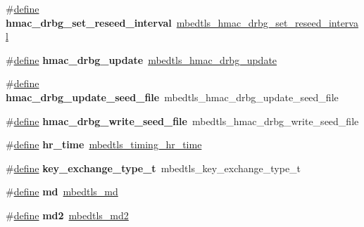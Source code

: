 \begin{DoxyCompactItemize}
\#\hyperlink{structdefine}{define} {\bfseries hmac\+\_\+drbg\+\_\+set\+\_\+reseed\+\_\+interval}~\hyperlink{hmac__drbg_8h_a17f9f894c4765e75d66b5b2fc8404fb2}{mbedtls\+\_\+hmac\+\_\+drbg\+\_\+set\+\_\+reseed\+\_\+interval}
\item 
\mbox{\label{compat-1_83_8h_af20facd5dc049dcf8adbb621e419fe89}} 
\#\hyperlink{structdefine}{define} {\bfseries hmac\+\_\+drbg\+\_\+update}~\hyperlink{hmac__drbg_8h_a19bdd8733bf4ffdec688367c77f7befa}{mbedtls\+\_\+hmac\+\_\+drbg\+\_\+update}
\item 
\mbox{\label{compat-1_83_8h_a1ffc2bde5a15ce6b17c2ed4d7160d472}} 
\#\hyperlink{structdefine}{define} {\bfseries hmac\+\_\+drbg\+\_\+update\+\_\+seed\+\_\+file}~mbedtls\+\_\+hmac\+\_\+drbg\+\_\+update\+\_\+seed\+\_\+file
\item 
\mbox{\label{compat-1_83_8h_ac44be22985d78e772a6c8681a748fddf}} 
\#\hyperlink{structdefine}{define} {\bfseries hmac\+\_\+drbg\+\_\+write\+\_\+seed\+\_\+file}~mbedtls\+\_\+hmac\+\_\+drbg\+\_\+write\+\_\+seed\+\_\+file
\item 
\mbox{\label{compat-1_83_8h_a7d6d2dba30ab5608bed7a872e3aee565}} 
\#\hyperlink{structdefine}{define} {\bfseries hr\+\_\+time}~\hyperlink{structmbedtls__timing__hr__time}{mbedtls\+\_\+timing\+\_\+hr\+\_\+time}
\item 
\mbox{\label{compat-1_83_8h_ada8ec4e8c5a2dfd2733222250a5ded90}} 
\#\hyperlink{structdefine}{define} {\bfseries key\+\_\+exchange\+\_\+type\+\_\+t}~mbedtls\+\_\+key\+\_\+exchange\+\_\+type\+\_\+t
\item 
\mbox{\label{compat-1_83_8h_aa259673bd7996b881b0754e3d35f09b6}} 
\#\hyperlink{structdefine}{define} {\bfseries md}~\hyperlink{md_8h_a36c5d8bda1905e0434708f0ef5912dda}{mbedtls\+\_\+md}
\item 
\mbox{\label{compat-1_83_8h_af3686fffe8ff04cf3441472f888261a9}} 
\#\hyperlink{structdefine}{define} {\bfseries md2}~\hyperlink{md2_8h_ae38f7d94f0e578afdf640e99eb68135d}{mbedtls\+\_\+md2}
\item 
\mbox{\label{compat-1_83_8h_a41f9a90cc8c8e395ce09cd0ce03ca6ae}} 

\end{DoxyCompactItemize}
